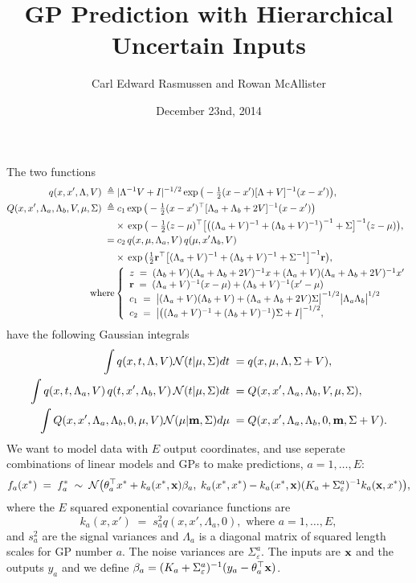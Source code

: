 \documentclass{article}
\title{GP Prediction with Hierarchical Uncertain Inputs}
\author{Carl Edward Rasmussen and Rowan McAllister}
\date{December 23nd, 2014}
\newcommand{\bfm}{{\bf m}}
\newcommand{\bfx}{{\bf x}}
\begin{document}
\maketitle

The two functions
\begin{equation}
\begin{split}
q(x,x',\Lambda,V)\;\triangleq&\;|\Lambda^{-1}V+I|^{-1/2}\exp\big(-\tfrac{1}{2}(x-x')[\Lambda+V]^{-1}(x-x')\big),\\
Q(x,x',\Lambda_a,\Lambda_b,V, \mu, \Sigma)\;\triangleq&\;
c_1\exp\big(-\tfrac{1}{2}(x-x')^\top[\Lambda_a+\Lambda_b+2V]^{-1}(x-x')\big)\\
&\times\,\exp\big(-\tfrac{1}{2}(z-\mu)^\top\big[\big((\Lambda_a+V)^{-1}+(\Lambda_b+V)^{-1}\big)^{-1}+\Sigma\big]^{-1}(z-\mu)\big),\\
=&\;c_2\,q(x,\mu,\Lambda_a,V)\,q(\mu,x'\Lambda_b,V)\\
&\times\,\exp\big(\tfrac{1}{2}{\bf
  r}^\top\big[(\Lambda_a+V)^{-1}+(\Lambda_b+V)^{-1}+\Sigma^{-1}\big]^{-1}{\bf r}\big),\\
\text{where}&\left\{\begin{array}{l}
z\;=\;(\Lambda_b+V)(\Lambda_a+\Lambda_b+2V)^{-1}x+(\Lambda_a+V)(\Lambda_a+\Lambda_b+2V)^{-1}x'\\
{\bf r}\;=\;(\Lambda_a+V)^{-1}(x-\mu)+(\Lambda_b+V)^{-1}(x'-\mu)\\
c_1\;=\;\big|(\Lambda_a+V)(\Lambda_b+V)+(\Lambda_a+\Lambda_b+2V)\Sigma\big|^{-1/2}\big|\Lambda_a\Lambda_b\big|^{1/2}\;\\
c_2\;=\;\big|\big((\Lambda_a+V)^{-1}+(\Lambda_b+V)^{-1}\big)\Sigma+I\big|^{-1/2},\end{array}\right.
\end{split}
\end{equation}
have the following Gaussian integrals
\begin{equation}
\begin{split}
\int q(x,t,\Lambda,V){\cal N}(t|\mu,\Sigma)dt\;=&\;q(x,\mu,\Lambda,\Sigma+V),\\
\int q(x,t,\Lambda_a,V)\,q(t,x',\Lambda_b,V)\,{\cal
  N}(t|\mu,\Sigma)dt\;=&\;Q(x,x',\Lambda_a,\Lambda_b,V,\mu,\Sigma),\\
\int Q(x,x',\Lambda_a,\Lambda_b,0,\mu,V){\cal N}(\mu|\bfm,\Sigma)d\mu\;=&\;Q(x,x',\Lambda_a,\Lambda_b,0,\bfm,\Sigma+V).
\end{split}
\end{equation}
%
We want to model data with $E$ output coordinates, and use seperate
combinations of linear models and GPs to make predictions,
$a=1,\ldots,E$:
\[
f_a(x^*)\;=\;f_a^*\;\sim\;{\cal N}\big(\theta_a^\top x^*+k_a(x^*,\bfx)\beta_a,\;
k_a(x^*,x^*)-k_a(x^*,\bfx)(K_a+\Sigma_\varepsilon^a)^{-1}k_a(\bfx,x^*)\big),
\]
where the $E$ squared exponential covariance functions are
\begin{equation}
k_a(x,x')\;=\;s_a^2q(x, x',\Lambda_a,0), \text{\ \ where\ \ }a=1,\ldots,E,
\end{equation}
and $s_a^2$ are the signal variances and $\Lambda_a$ is a diagonal
matrix of squared length scales for GP number $a$. The noise variances
are $\Sigma_\varepsilon^a$. The inputs are $\bfx$ and the outputs
$y_a$ and we define $\beta_a=(K_a+\Sigma_\varepsilon^a)^{-1}(y_a-\theta_a^\top\bfx)$.
\end{document}
